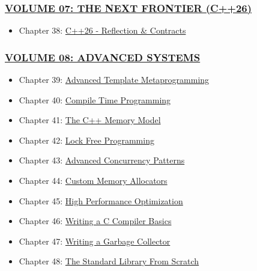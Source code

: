 \hypertarget{volume-07-the-next-frontier-c26}{%
\subsubsection{\texorpdfstring{\protect\hyperlink{volume-07-the-next-frontier-c26}{VOLUME
07: THE NEXT FRONTIER
(C++26)}}{VOLUME 07: THE NEXT FRONTIER (C++26)}}\label{volume-07-the-next-frontier-c26}}

\begin{itemize}
\tightlist
\item
  Chapter 38:
  \protect\hyperlink{chapter-38-c26---the-next-frontier}{C++26 -
  Reflection \& Contracts}
\end{itemize}

\hypertarget{volume-08-advanced-systems}{%
\subsubsection{\texorpdfstring{\protect\hyperlink{volume-08-advanced-systems}{VOLUME
08: ADVANCED
SYSTEMS}}{VOLUME 08: ADVANCED SYSTEMS}}\label{volume-08-advanced-systems}}

\begin{itemize}
\tightlist
\item
  Chapter 39:
  \protect\hyperlink{chapter-39-advanced-template-metaprogramming}{Advanced
  Template Metaprogramming}
\item
  Chapter 40:
  \protect\hyperlink{chapter-40-compile-time-programming}{Compile Time
  Programming}
\item
  Chapter 41: \protect\hyperlink{chapter-41-the-cpp-memory-model}{The
  C++ Memory Model}
\item
  Chapter 42: \protect\hyperlink{chapter-42-lock-free-programming}{Lock
  Free Programming}
\item
  Chapter 43:
  \protect\hyperlink{chapter-43-advanced-concurrency-patterns}{Advanced
  Concurrency Patterns}
\item
  Chapter 44:
  \protect\hyperlink{chapter-44-custom-memory-allocators}{Custom Memory
  Allocators}
\item
  Chapter 45:
  \protect\hyperlink{chapter-45-high-performance-optimization}{High
  Performance Optimization}
\item
  Chapter 46:
  \protect\hyperlink{chapter-46-writing-a-c-compiler-basics}{Writing a C
  Compiler Basics}
\item
  Chapter 47:
  \protect\hyperlink{chapter-47-writing-a-garbage-collector}{Writing a
  Garbage Collector}
\item
  Chapter 48:
  \protect\hyperlink{chapter-48-the-standard-library-from-scratch}{The
  Standard Library From Scratch}
\end{itemize}

